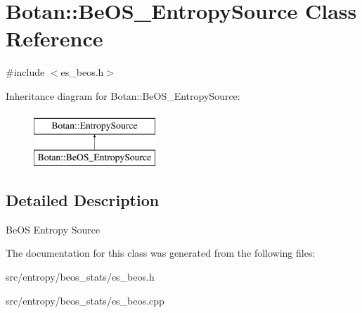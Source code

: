 \hypertarget{classBotan_1_1BeOS__EntropySource}{\section{Botan\-:\-:Be\-O\-S\-\_\-\-Entropy\-Source Class Reference}
\label{classBotan_1_1BeOS__EntropySource}
}


{\ttfamily \#include $<$es\-\_\-beos.\-h$>$}

Inheritance diagram for Botan\-:\-:Be\-O\-S\-\_\-\-Entropy\-Source\-:\begin{figure}[H]
\begin{center}
\leavevmode
\includegraphics[height=2.000000cm]{classBotan_1_1BeOS__EntropySource}
\end{center}
\end{figure}


\subsection{Detailed Description}
Be\-O\-S Entropy Source 

The documentation for this class was generated from the following files\-:\begin{DoxyCompactItemize}
\item 
src/entropy/beos\-\_\-stats/es\-\_\-beos.\-h\item 
src/entropy/beos\-\_\-stats/es\-\_\-beos.\-cpp\end{DoxyCompactItemize}
